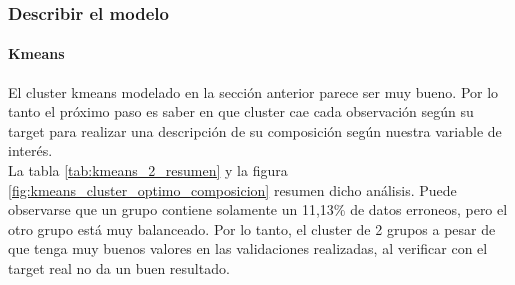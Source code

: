 \subsubsection{\textbf{Describir el modelo}}

\paragraph{\textbf{Kmeans}}
El cluster kmeans modelado en la sección anterior parece ser muy bueno. Por lo tanto el próximo paso es saber en que cluster cae cada observación según su target para realizar una descripción de su composición según nuestra variable de interés.\\
La tabla \ref{tab:kmeans_2_resumen} y la figura \ref{fig:kmeans_cluster_optimo_composicion} resumen dicho análisis. Puede observarse que un grupo contiene solamente un 11,13\% de datos
erroneos, pero el otro grupo está muy balanceado. Por lo tanto, el
cluster de 2 grupos a pesar de que tenga muy buenos valores en las
validaciones realizadas, al verificar con el target real no da un buen resultado.

\begin{table}[!h]
	
	\caption{\label{tab:kmeans_2_resumen}Resumen composición de cluster Kmeans según clase desertor}
	\centering
\end{table}


